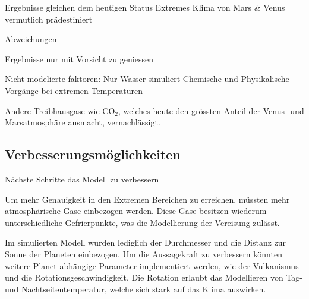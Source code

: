 \begin{refsection}
Ergebnisse gleichen dem heutigen Status
Extremes Klima von Mars \& Venus vermutlich prädestiniert

Abweichungen

Ergebnisse nur mit Vorsicht zu geniessen

Nicht modelierte faktoren:
Nur Wasser simuliert
Chemische und Physikalische Vorgänge bei extremen Temperaturen

Andere Treibhausgase wie CO$_2$, welches heute den grössten Anteil der Venus- und Marsatmosphäre ausmacht, vernachlässigt.

\subsection{Verbesserungsmöglichkeiten}

Nächste Schritte das Modell zu verbessern

Um mehr Genauigkeit in den Extremen Bereichen zu erreichen, müssten mehr atmosphärische Gase einbezogen werden.
Diese Gase besitzen wiederum unterschiedliche Gefrierpunkte, was die Modellierung der Vereisung zulässt.
		
Im simulierten Modell wurden lediglich der Durchmesser und die Distanz zur Sonne der Planeten einbezogen. Um die Aussagekraft zu verbessern könnten weitere Planet-abhängige Parameter implementiert werden, wie der Vulkanismus und die Rotationsgeschwindigkeit. Die Rotation erlaubt das Modellieren von Tag- und Nachtseitentemperatur, welche sich stark auf das Klima auswirken.


\printbibliography[heading=subbibliography]
\end{refsection}
